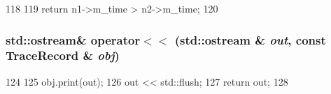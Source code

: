 \begin{DoxyCode}
118 {
119     return n1->m_time > n2->m_time;
120 }
\end{DoxyCode}
\hypertarget{CacheRecorder_8hh_a2a1c0256ae48f49b411edc0208af933b}{
\subsubsection[{operator$<$$<$}]{\setlength{\rightskip}{0pt plus 5cm}std::ostream\& operator$<$$<$ (std::ostream \& {\em out}, \/  const {\bf TraceRecord} \& {\em obj})}}
\label{CacheRecorder_8hh_a2a1c0256ae48f49b411edc0208af933b}



\begin{DoxyCode}
124 {
125     obj.print(out);
126     out << std::flush;
127     return out;
128 }
\end{DoxyCode}
